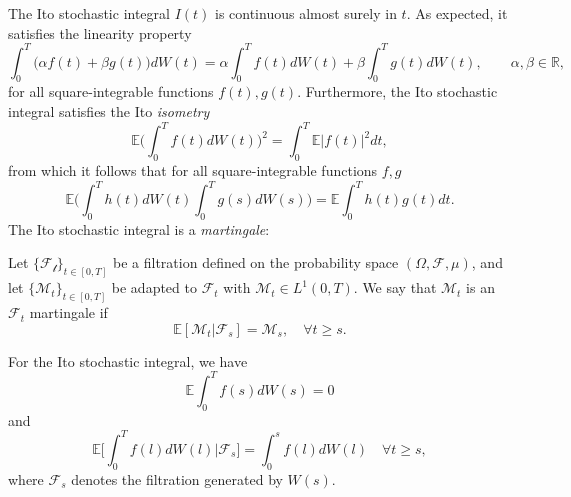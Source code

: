 \documentclass{article}
\begin{document}
The Ito stochastic integral $I(t)$ is continuous almost surely in $t$. As expected, it satisfies the linearity property
$$\int_0^T \big(\alpha f(t)+\beta g(t)\big)dW(t)= \alpha \int_0^T f(t)dW(t)+\beta \int_0^T g(t)dW(t),\qquad \alpha,\beta\in \mathbb{R,}$$
for all square-integrable functions $f(t),g(t)$. Furthermore, the Ito stochastic integral satisfies the Ito \textit{isometry}
$$\mathbb{E}\big(\int_0^Tf(t)dW(t)\big)^2 = \int_0^T \mathbb{E}|f(t)|^2dt,$$
from which it follows that for all square-integrable functions $f,g$
$$\mathbb{E}\big(\int_0^Th(t)dW(t)\int_0^Tg(s)dW(s)\big) = \mathbb{E}\int_0^Th(t)g(t)dt.$$
The Ito stochastic integral is a \textit{martingale}:
\begin{definition}
    Let $\{ \mathcal{F_t} \}_{t\in [0,T]}$ be a filtration defined on the probability space $(\Omega,\mathcal{F},\mu)$, and let $\{ \mathcal{M}_t\}_{t \in [0,T]}$ be adapted to $\mathcal{F}_t$ with $\mathcal{M}_t \in L^1(0,T)$. We say that $\mathcal{M}_t$ is an $\mathcal{F}_t$ martingale if
    $$\mathbb{E}[\mathcal{M}_t|\mathcal{F}_s] = \mathcal{M}_s, \quad \forall t\geq s.$$
\end{definition}
For the Ito stochastic integral, we have
\begin{equation}
    \mathbb{E}\int_0^Tf(s)dW(s)=0
\end{equation}
and
\begin{equation}
    \mathbb{E}\Big[\int_0^T f(l)dW(l)|\mathcal{F}_s \Big] = \int_0^sf(l)dW(l) \quad \forall t\geq s,
\end{equation}
where $\mathcal{F}_s$ denotes the filtration generated by $W(s)$.
\end{document}
